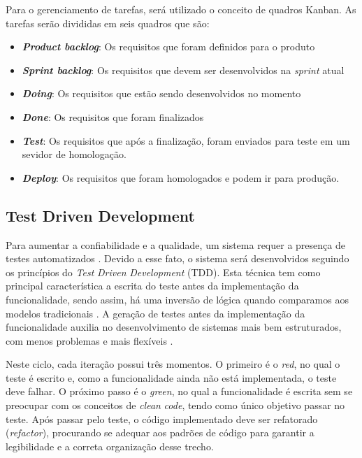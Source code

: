 Para o gerenciamento de tarefas, será utilizado o conceito de quadros Kanban. As tarefas serão divididas em seis quadros que são:
\begin{itemize}
    \item \textbf{\textit{Product backlog}}: Os requisitos que foram definidos para o produto
    \item \textbf{\textit{Sprint backlog}}: Os requisitos que devem ser desenvolvidos na \textit{sprint} atual
    \item \textbf{\textit{Doing}}: Os requisitos que estão sendo desenvolvidos no momento
    \item \textbf{\textit{Done}}: Os requisitos que foram finalizados
    \item \textbf{\textit{Test}}: Os requisitos que após a finalização, foram enviados para teste em um sevidor de homologação.
    \item \textbf{\textit{Deploy}}: Os requisitos que foram homologados e podem ir para produção.
\end{itemize}

\subsection{Test Driven Development}
\label{subsec:tdd}

Para aumentar a confiabilidade e a qualidade, um sistema requer a presença de testes automatizados \cite{myers2004art}. Devido a esse fato, o sistema será desenvolvidos seguindo os princípios do \textit{Test} \textit{Driven} \textit{Development} (TDD). Esta técnica tem como principal característica a escrita do teste antes da implementação da funcionalidade, sendo assim, há uma inversão de lógica quando comparamos aos modelos tradicionais \cite{erdogmus2005effectiveness}. A geração de testes antes da implementação da funcionalidade auxilia no desenvolvimento de sistemas mais bem estruturados, com menos problemas e mais flexíveis \cite{melnik2007empirical}.

Neste ciclo, cada iteração possui três momentos. O primeiro é o \textit{red}, no qual o teste é escrito e, como a funcionalidade ainda não está implementada, o teste deve falhar. O próximo passo é o \textit{green}, no qual a funcionalidade é escrita sem se preocupar com os conceitos de \textit{clean} \textit{code}, tendo como único objetivo passar no teste. Após passar pelo teste, o código implementado deve ser refatorado (\textit{refactor}), procurando se adequar aos padrões de código para garantir a legibilidade e a correta organização desse trecho.

